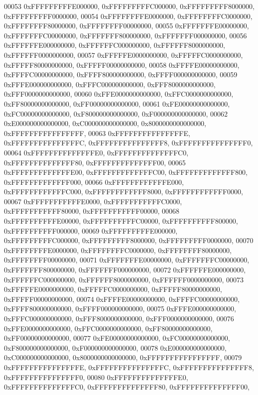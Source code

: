 \begin{DoxyCode}
00053         0xFFFFFFFFFE000000, 0xFFFFFFFFFC000000, 0xFFFFFFFFF8000000, 0xFFFFFFFFF0000000,
00054         0xFFFFFFFFE0000000, 0xFFFFFFFFC0000000, 0xFFFFFFFF80000000, 0xFFFFFFFF00000000,
00055         0xFFFFFFFE00000000, 0xFFFFFFFC00000000, 0xFFFFFFF800000000, 0xFFFFFFF000000000,
00056         0xFFFFFFE000000000, 0xFFFFFFC000000000, 0xFFFFFF8000000000, 0xFFFFFF0000000000,
00057         0xFFFFFE0000000000, 0xFFFFFC0000000000, 0xFFFFF80000000000, 0xFFFFF00000000000,
00058         0xFFFFE00000000000, 0xFFFFC00000000000, 0xFFFF800000000000, 0xFFFF000000000000,
00059         0xFFFE000000000000, 0xFFFC000000000000, 0xFFF8000000000000, 0xFFF0000000000000,
00060         0xFFE0000000000000, 0xFFC0000000000000, 0xFF80000000000000, 0xFF00000000000000,
00061         0xFE00000000000000, 0xFC00000000000000, 0xF800000000000000, 0xF000000000000000,
00062         0xE000000000000000, 0xC000000000000000, 0x8000000000000000, 0xFFFFFFFFFFFFFFFF,
00063         0xFFFFFFFFFFFFFFFE, 0xFFFFFFFFFFFFFFFC, 0xFFFFFFFFFFFFFFF8, 0xFFFFFFFFFFFFFFF0,
00064         0xFFFFFFFFFFFFFFE0, 0xFFFFFFFFFFFFFFC0, 0xFFFFFFFFFFFFFF80, 0xFFFFFFFFFFFFFF00,
00065         0xFFFFFFFFFFFFFE00, 0xFFFFFFFFFFFFFC00, 0xFFFFFFFFFFFFF800, 0xFFFFFFFFFFFFF000,
00066         0xFFFFFFFFFFFFE000, 0xFFFFFFFFFFFFC000, 0xFFFFFFFFFFFF8000, 0xFFFFFFFFFFFF0000,
00067         0xFFFFFFFFFFFE0000, 0xFFFFFFFFFFFC0000, 0xFFFFFFFFFFF80000, 0xFFFFFFFFFFF00000,
00068         0xFFFFFFFFFFE00000, 0xFFFFFFFFFFC00000, 0xFFFFFFFFFF800000, 0xFFFFFFFFFF000000,
00069         0xFFFFFFFFFE000000, 0xFFFFFFFFFC000000, 0xFFFFFFFFF8000000, 0xFFFFFFFFF0000000,
00070         0xFFFFFFFFE0000000, 0xFFFFFFFFC0000000, 0xFFFFFFFF80000000, 0xFFFFFFFF00000000,
00071         0xFFFFFFFE00000000, 0xFFFFFFFC00000000, 0xFFFFFFF800000000, 0xFFFFFFF000000000,
00072         0xFFFFFFE000000000, 0xFFFFFFC000000000, 0xFFFFFF8000000000, 0xFFFFFF0000000000,
00073         0xFFFFFE0000000000, 0xFFFFFC0000000000, 0xFFFFF80000000000, 0xFFFFF00000000000,
00074         0xFFFFE00000000000, 0xFFFFC00000000000, 0xFFFF800000000000, 0xFFFF000000000000,
00075         0xFFFE000000000000, 0xFFFC000000000000, 0xFFF8000000000000, 0xFFF0000000000000,
00076         0xFFE0000000000000, 0xFFC0000000000000, 0xFF80000000000000, 0xFF00000000000000,
00077         0xFE00000000000000, 0xFC00000000000000, 0xF800000000000000, 0xF000000000000000,
00078         0xE000000000000000, 0xC000000000000000, 0x8000000000000000, 0xFFFFFFFFFFFFFFFF,
00079         0xFFFFFFFFFFFFFFFE, 0xFFFFFFFFFFFFFFFC, 0xFFFFFFFFFFFFFFF8, 0xFFFFFFFFFFFFFFF0,
00080         0xFFFFFFFFFFFFFFE0, 0xFFFFFFFFFFFFFFC0, 0xFFFFFFFFFFFFFF80, 0xFFFFFFFFFFFFFF00,

\end{DoxyCode}
